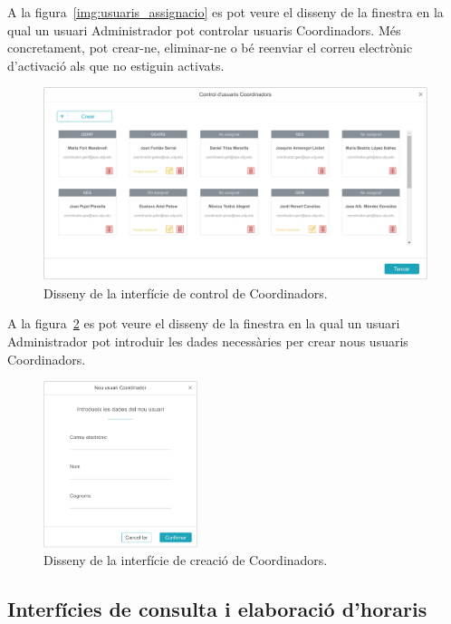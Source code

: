 \documentclass[a4paper,12pt]{ThesisStyle}
\begin{document}
A la figura~\ref{img:usuaris_assignacio} es pot veure el disseny de la finestra en la qual un usuari Administrador pot controlar usuaris Coordinadors. Més concretament, pot crear-ne, eliminar-ne o bé reenviar el correu electrònic d'activació als que no estiguin activats.
\begin{figure}[H]
	\centering
	\includegraphics[width=\textwidth]{assets/interfaces/usuaris/control.pdf}
	\caption{\label{img:usuaris_control}Disseny de la interfície de control de Coordinadors.}
\end{figure}

A la figura~\ref{img:usuaris_crear} es pot veure el disseny de la finestra en la qual un usuari Administrador pot introduir les dades necessàries per crear nous usuaris Coordinadors.
\begin{figure}[H]
	\centering
	\includegraphics[width=0.4\textwidth]{assets/interfaces/usuaris/crear.pdf}
	\caption{\label{img:usuaris_crear}Disseny de la interfície de creació de Coordinadors.}
\end{figure}

\subsection{Interfícies de consulta i elaboració d'horaris}
\label{subsec:interficies_horaris}
\end{document}
